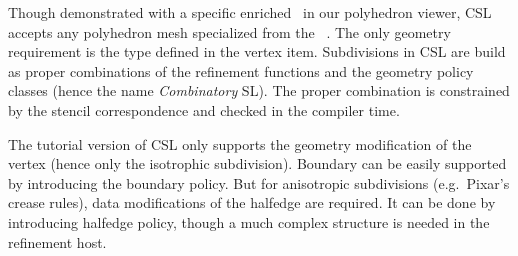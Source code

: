 Though demonstrated with a specific enriched \poly\ in our polyhedron
viewer, CSL accepts any polyhedron mesh specialized from the \poly\
. The only geometry requirement is the  type defined in
the vertex item.  Subdivisions in CSL are build as proper combinations
of the refinement functions and the geometry policy classes (hence the
name \emph{Combinatory} SL). The proper combination is constrained by
the stencil correspondence and checked in the compiler time.

The tutorial version of CSL only supports the geometry modification of the
vertex (hence only the isotrophic subdivision). Boundary can be easily
supported by introducing the boundary policy. But for anisotropic
subdivisions (e.g.\ Pixar's crease rules), data modifications of the
halfedge are required. It can be done by introducing halfedge policy,
though a much complex structure is needed in the refinement host.

